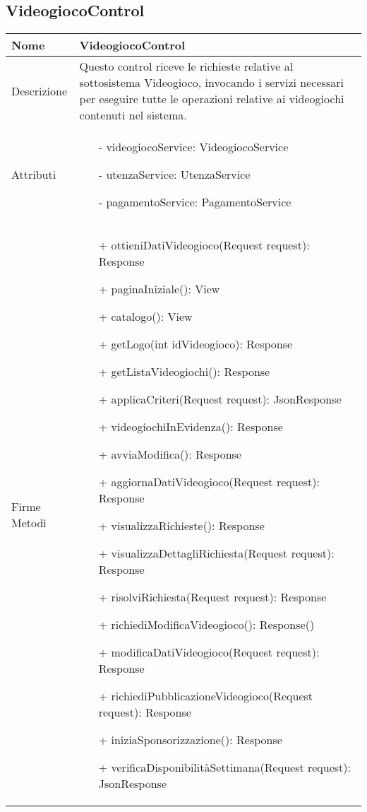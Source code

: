 \newpage
\subsection{VideogiocoControl}
\small\begin{tabular}{|| l | p{28em} ||} 
	\hline
	Nome & VideogiocoControl\\
	\hline
	Descrizione & Questo control riceve le richieste relative al sottosistema Videogioco, invocando i servizi necessari per eseguire tutte le operazioni relative ai videogiochi contenuti nel sistema. \\
	\hline
	Attributi & \begin{itemize}
		\item[-] videogiocoService: VideogiocoService
		\item[-] utenzaService: UtenzaService
		\item[-] pagamentoService: PagamentoService
	\end{itemize}\\
	\hline
	Firme Metodi & \begin{itemize}
		\item[+] ottieniDatiVideogioco(Request request): Response
		\item[+] paginaIniziale(): View 
		\item[+] catalogo(): View 
		\item[+] getLogo(int idVideogioco): Response
		\item[+] getListaVideogiochi(): Response
		\item[+] applicaCriteri(Request request): JsonResponse
		\item[+] videogiochiInEvidenza(): Response
		\item[+] avviaModifica(): Response
		\item[+] aggiornaDatiVideogioco(Request request): Response
		\item[+] visualizzaRichieste(): Response
		\item[+] visualizzaDettagliRichiesta(Request request): Response
		\item[+] risolviRichiesta(Request request): Response
		\item[+] richiediModificaVideogioco(): Response()
		\item[+] modificaDatiVideogioco(Request request): Response
		\item[+] richiediPubblicazioneVideogioco(Request request): Response
		\item[+] iniziaSponsorizzazione(): Response
		\item[+] verificaDisponibilitàSettimana(Request request): JsonResponse

\end{itemize}
\end{tabular}
